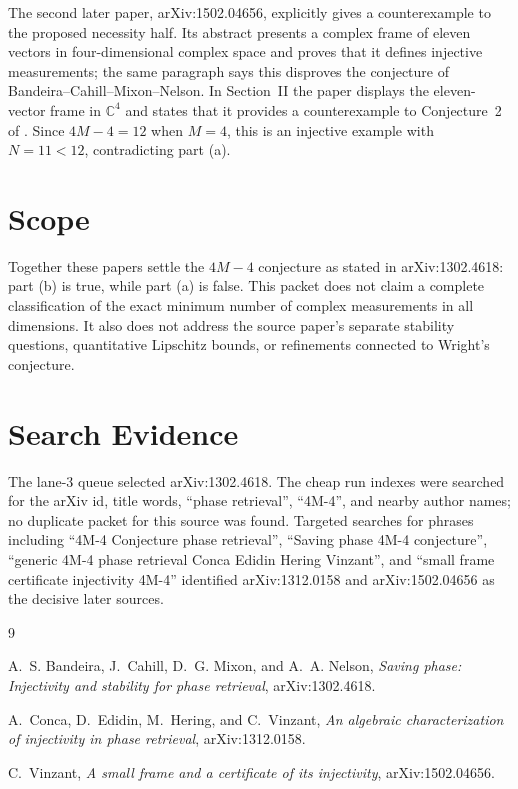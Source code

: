 \documentclass[11pt]{article}
\begin{document}
The second later paper, arXiv:1502.04656, explicitly gives a counterexample to
the proposed necessity half.  Its abstract presents a complex frame of eleven
vectors in four-dimensional complex space and proves that it defines injective
measurements; the same paragraph says this disproves the conjecture of
Bandeira--Cahill--Mixon--Nelson.  In Section~II the paper displays the
eleven-vector frame in \(\mathbb C^4\) and states that it provides a
counterexample to Conjecture~2 of \cite{BCMN13}.  Since \(4M-4=12\) when
\(M=4\), this is an injective example with \(N=11<12\), contradicting part
(a).

\section*{Scope}

Together these papers settle the \(4M-4\) conjecture as stated in
arXiv:1302.4618: part (b) is true, while part (a) is false.  This packet does
not claim a complete classification of the exact minimum number of complex
measurements in all dimensions.  It also does not address the source paper's
separate stability questions, quantitative Lipschitz bounds, or refinements
connected to Wright's conjecture.

\section*{Search Evidence}

The lane-3 queue selected arXiv:1302.4618.  The cheap run indexes were searched
for the arXiv id, title words, ``phase retrieval'', ``4M-4'', and nearby
author names; no duplicate packet for this source was found.  Targeted searches
for phrases including ``4M-4 Conjecture phase retrieval'', ``Saving phase
4M-4 conjecture'', ``generic 4M-4 phase retrieval Conca Edidin Hering
Vinzant'', and ``small frame certificate injectivity 4M-4'' identified
arXiv:1312.0158 and arXiv:1502.04656 as the decisive later sources.

\begin{thebibliography}{9}

A.~S. Bandeira, J.~Cahill, D.~G. Mixon, and A.~A. Nelson,
\emph{Saving phase: Injectivity and stability for phase retrieval},
arXiv:1302.4618.

A.~Conca, D.~Edidin, M.~Hering, and C.~Vinzant,
\emph{An algebraic characterization of injectivity in phase retrieval},
arXiv:1312.0158.

C.~Vinzant,
\emph{A small frame and a certificate of its injectivity},
arXiv:1502.04656.

\end{thebibliography}
\end{document}
